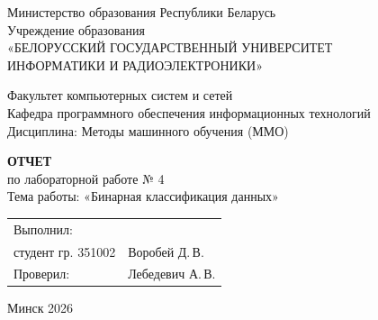 \documentclass[14pt,a4paper]{extarticle}
\begin{document}
\begin{titlepage}
    \begin{center}
        Министерство образования Республики Беларусь\\[0.15cm]
        Учреждение образования\\[0.15cm]
        «БЕЛОРУССКИЙ ГОСУДАРСТВЕННЫЙ УНИВЕРСИТЕТ\\
        ИНФОРМАТИКИ И РАДИОЭЛЕКТРОНИКИ»
    \end{center}
    
    \vspace{0.4cm}
    
    \begin{flushleft}
        Факультет компьютерных систем и сетей\\[0.1cm]
        Кафедра программного обеспечения информационных технологий\\[0.1cm]
        Дисциплина: Методы машинного обучения (ММО)
    \end{flushleft}
    
    \vspace{2.2cm}
    
    \begin{center}
        \large\textbf{ОТЧЕТ}\\[0.2cm]
        \normalsize
        {по лабораторной работе № 4}\\[0.2cm]
        {Тема работы: «Бинарная классификация данных»}
    \end{center}
    
    \vspace{2.5cm}
    
    \noindent
    \begin{tabular}{@{}p{}@{}p{}@{}}
        Выполнил: & \\
        студент гр. 351002 & Воробей Д.\,В. \\[0.5cm]
        Проверил: & Лебедевич А.\,В.
    \end{tabular}
    
    \vfill
    
    \begin{center}
        Минск 2026
    \end{center}
\end{titlepage}

\setcounter{page}{2}
\end{document}
